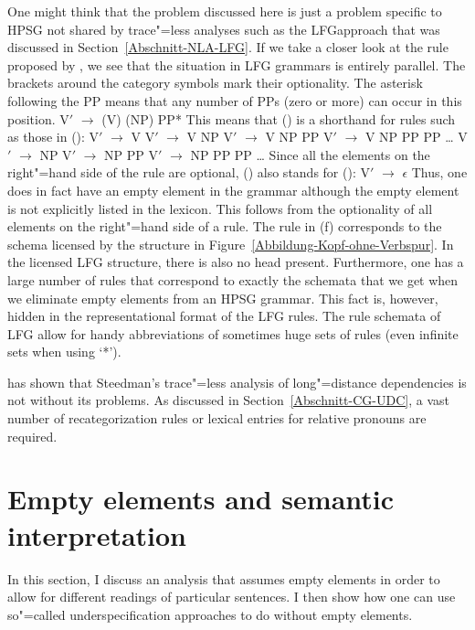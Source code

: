 One might think that the problem discussed here is just a problem specific to HPSG not shared by trace"=less analyses such as the LFG\indexlfgstart approach
that was discussed in Section~\ref{Abschnitt-NLA-LFG}. If we take a closer look at the rule proposed by \citet[Section~2.2]{Dalrymple2006a}, we see that the situation in LFG grammars is entirely
parallel. The brackets around the category symbols mark their optionality. The asterisk following
the PP means that any number of PPs (zero or more) can occur in this position.
\ea
V$'$ $\to$ (V) (NP) PP*
\z
This means that () is a shorthand for rules such as those in ():
\eal
\ex V$'$ $\to$ V
\ex V$'$ $\to$ V NP
\ex V$'$ $\to$ V NP PP
\ex V$'$ $\to$ V NP PP PP
\ex \ldots
\ex V$'$ $\to$ NP
\ex V$'$ $\to$ NP PP
\ex V$'$ $\to$ NP PP PP
\ex \ldots
\zl
Since all the elements on the right"=hand side of the rule are optional, () also stands for ():
\ea
V$'$ $\to$ $\epsilon$
\z
Thus, one does in fact have an empty element in the grammar although the empty element is not explicitly listed in the lexicon.
This follows from the optionality of all elements on the right"=hand side of a rule. The rule in (f) corresponds
to the schema licensed by the structure in Figure~\ref{Abbildung-Kopf-ohne-Verbspur}. In the licensed LFG structure, there is 
also no head present. Furthermore, one has a large number of rules that correspond to exactly the schemata that we get when
we eliminate empty elements from an HPSG grammar. This fact is, however, hidden in the representational format of the LFG rules.
The rule schemata of LFG allow for handy abbreviations of sometimes huge sets of rules (even infinite sets when using `*').\indexlfgend

\citet{Pollard88a} has shown that Steedman's trace"=less analysis of long"=distance dependencies is not without its problems.
As discussed in Section~\ref{Abschnitt-CG-UDC}, a vast number of recategorization rules or lexical entries for
relative pronouns are required.

\section{Empty elements and semantic interpretation}
\label{Abschnitt-leere-Elemente-Semantik}
\label{sec-MRS-wieder}

In this section, I discuss an analysis that assumes empty elements in order to allow for different readings of particular sentences. I then show how
one can use so"=called underspecification approaches to do without empty elements.

